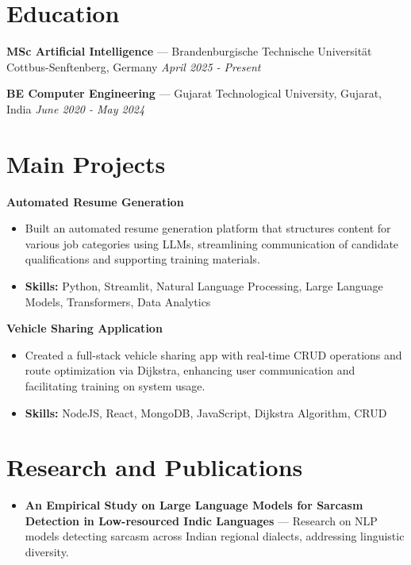 \documentclass[a4paper,10pt]{article}
\begin{document}
\section*{Education}
\textbf{MSc Artificial Intelligence} — Brandenburgische Technische Universität Cottbus-Senftenberg, Germany \hfill \textit{April 2025 - Present}\par
\vspace{1.5pt}
\textbf{BE Computer Engineering} — Gujarat Technological University, Gujarat, India \hfill \textit{June 2020 - May 2024}\par

\section*{Main Projects}
\textbf{Automated Resume Generation}\par
\vspace{1pt}
\begin{itemize}
  \item Built an automated resume generation platform that structures content for various job categories using LLMs, streamlining communication of candidate qualifications and supporting training materials.
  \item \textbf{Skills:} Python, Streamlit, Natural Language Processing, Large Language Models, Transformers, Data Analytics
\end{itemize}
\vspace{3pt}
\textbf{Vehicle Sharing Application}\par
\vspace{1pt}
\begin{itemize}
  \item Created a full-stack vehicle sharing app with real-time CRUD operations and route optimization via Dijkstra, enhancing user communication and facilitating training on system usage.
  \item \textbf{Skills:} NodeJS, React, MongoDB, JavaScript, Dijkstra Algorithm, CRUD
\end{itemize}

\section*{Research and Publications}
\begin{itemize}
\item \textbf{An Empirical Study on Large Language Models for Sarcasm Detection in Low-resourced Indic Languages} — Research on NLP models detecting sarcasm across Indian regional dialects, addressing linguistic diversity.
\end{itemize}
\end{document}
